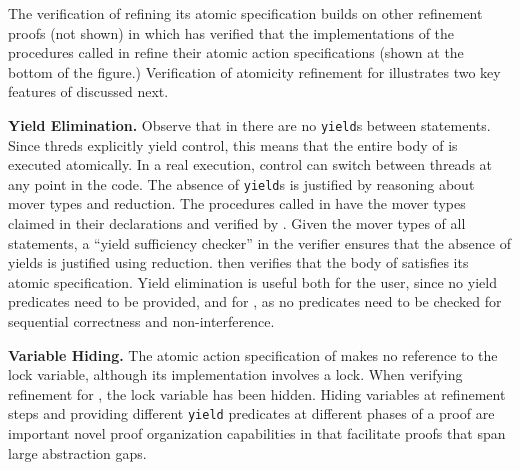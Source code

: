 The verification of  refining its atomic specification
builds on other refinement proofs (not shown) in which \civl has
verified that the implementations of the procedures called in
 refine their atomic action specifications (shown at the
bottom of the figure.) Verification of atomicity refinement for
 illustrates two key features of \civl discussed next. 

{\bf Yield Elimination.} Observe that in 
 there are no {\tt yield}s between
statements. Since threds explicitly yield control, this means that the
entire body of  is executed atomically. In
a real execution, control can switch between threads at any point in
the code. The absence of {\tt yield}s is justified by reasoning about
mover types and reduction. The procedures called in
 have the mover types claimed in their
declarations and verified by \civl. Given the mover types of all
statements, a ``yield sufficiency
checker'' in the \civl verifier ensures
that the absence of yields is justified using reduction.  \civl
then verifies that the body of  satisfies
its atomic specification. Yield elimination is useful both for the
user, since no yield predicates need to be provided, and for \civl,
as no predicates need to be checked for sequential correctness and
non-interference.

{\bf Variable Hiding.} The atomic action specification of 
makes no reference to the lock variable, although its implementation
involves a lock. When verifying refinement for , the lock
variable has been hidden. Hiding variables at refinement steps and
providing different {\tt yield} predicates at different phases of a
proof are important novel proof organization capabilities in \civl
that facilitate proofs that span large abstraction gaps.


